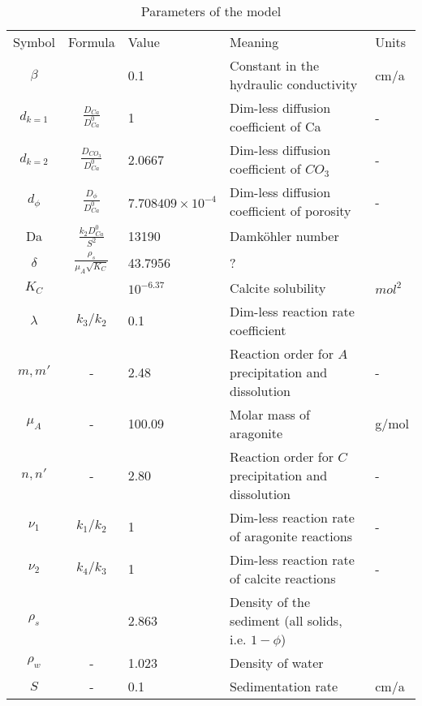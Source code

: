 \documentclass[11pt, letterpaper]{article}
\begin{document}
\begin{table}
    \centering
    \begin{tabular}{cclll}
 Symbol& Formula& Value&Meaning &Units\\
 $\beta$& & 0.1& Constant in the hydraulic conductivity&cm/a\\
 $d_{k=1}$& $\frac{D_{Ca}}{D_{Ca}^0}$& 1& Dim-less diffusion coefficient of Ca&-\\
 $d_{k=2}$& $\frac{D_{CO_{3}}}{D_{Ca}^0}$& 2.0667& Dim-less diffusion coefficient of $CO_3$&-\\
 $d_\phi$& $\frac{D_\phi}{D_{Ca}^0}$& $7.708409\times10^{-4}$& Dim-less diffusion coefficient of porosity&-\\
         Da&  $\frac{k_2D_{Ca}^0}{S^2}$& 13190&Damköhler number &\\
 $\delta$& $\frac{\rho_s}{\mu_A\sqrt{K_C}}$& 43.7956& ?&\\
 $K_C$& & $10^{-6.37}$& Calcite solubility&$mol^2$\\
         $\lambda$&  $k_3/k_2$& 0.1& Dim-less reaction rate coefficient&\\
 $m, m'$& -& 2.48&Reaction order for $A$ precipitation and dissolution&-\\
 $\mu_A$& -& 100.09& Molar mass of aragonite&g/mol\\
 $n, n'$& -& 2.80&Reaction order for $C$ precipitation and dissolution&-\\
         $\nu_1$&  $k_1/k_2$& 1& Dim-less reaction rate of aragonite reactions&-\\
         $\nu_2$&  $k_4/k_3$& 1& Dim-less reaction rate of calcite reactions&-\\
         $\rho_s$&  & 2.863& Density of the sediment (all solids, i.e. $1 - \phi$)&\\
         $\rho_w$&  -& 1.023& Density of water&\\
 $S$& -& 0.1& Sedimentation rate&cm/a\\
    \end{tabular}
    \caption{Parameters of the model}
\end{table}
\end{document}
